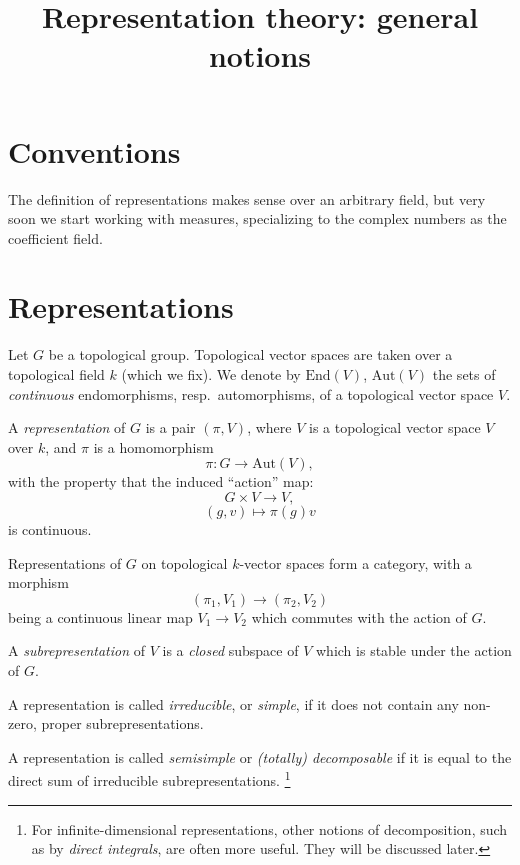 

%


\title{Representation theory: general notions}


\maketitle

\label{section-phantom}


\tableofcontents


\section{Conventions}
\label{section-conventions}

The definition of representations makes sense over an arbitrary field, but very soon we start working with measures, specializing to the complex numbers as the coefficient field.

\section{Representations}
\label{section-representations}

Let $G$ be a topological group. Topological vector spaces are taken over a 
topological field $k$ (which we fix). We denote by $\text{End}(V)$, 
$\text{Aut}(V)$ the sets of {\it continuous} endomorphisms, resp.\ automorphisms, of a topological vector space $V$.


\begin{definition}
\label{definition-representation}
A {\it representation} of $G$ is a pair $(\pi,V)$, where $V$ is a topological vector space $V$ over $k$, and $\pi$ is a 
homomorphism
$$\pi: G\to \text{Aut}(V),$$
with the property that the induced ``action'' map:
$$G\times V\to V,$$
$$(g,v)\mapsto \pi(g) v$$
is continuous.

Representations of $G$ on topological $k$-vector spaces form a category, with a morphism 
$$ (\pi_1, V_1)\to (\pi_2,V_2)$$
being a continuous linear map $V_1\to V_2$ which commutes with the action of $G$. 

A {\it subrepresentation} of $V$ is a {\it closed} subspace of $V$ which is stable under the action of $G$.

A representation is called {\it irreducible}, or {\it simple}, if it does not contain any non-zero, proper subrepresentations. 

A representation is called {\it semisimple} or {\it (totally) decomposable} if it is equal to the direct sum of irreducible subrepresentations. \footnote{For infinite-dimensional representations, other notions of decomposition, such as by {\it direct integrals}, are often more useful. They will be discussed later.} 
\end{definition}


